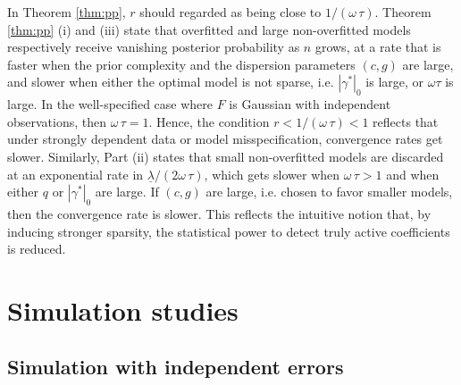 In Theorem \ref{thm:pp},  $r$ should regarded as being close to $1/(\omega\, \tau)$. Theorem \ref{thm:pp} (i) and (iii) state that overfitted and large non-overfitted models respectively receive vanishing posterior probability as $n$ grows, at a rate that is faster when the prior complexity and the dispersion parameters $(c,g)$ are large, and slower when either the optimal model is not sparse, i.e. $|\gamma^*|_0$ is large, or $\omega \tau$ is large.
In the well-specified case where $F$ is Gaussian with independent observations, then $\omega\, \tau=1$. Hence, the condition $r < 1/(\omega\,  \tau) <1$ reflects that under strongly dependent data or model misspecification, convergence rates get slower.
Similarly, Part (ii) states that small non-overfitted models are discarded at an exponential rate in $\underline{\lambda}/(2\omega\, \tau)$, which gets slower when $ \omega\, \tau>1$ and when either  $q$ or $|\gamma^*|_0$ are large. If $(c,g)$ are large, i.e. chosen to favor smaller models, then the convergence rate is slower. This reflects the intuitive notion that, by inducing stronger sparsity, the statistical power to detect truly active coefficients is reduced.


\section{Simulation studies}
\label{sec:results}


\subsection{Simulation with independent errors}
\label{sec:simulation_iid}

